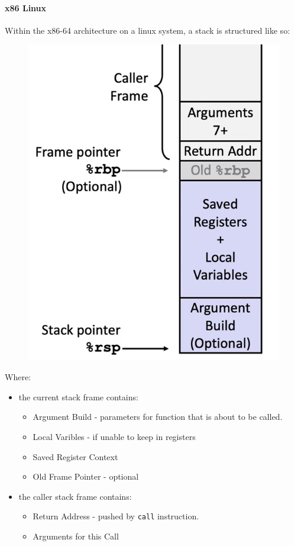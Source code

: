 \documentclass[12pt]{book}
\begin{document}
\paragraph{x86 Linux} 
Within the x86-64 architecture on a linux system, a stack is structured like so:
\begin{figure}[h]
        \centering
        \includegraphics[scale = 0.3]{./figures/x86stackframe}
\end{figure}

Where:
\begin{itemize}
        \item the current stack frame contains:
                \begin{itemize}
                        \item Argument Build - parameters for function that is about to be called.
                        \item Local Varibles - if unable to keep in registers
                        \item Saved Register Context
                        \item Old Frame Pointer - optional
                \end{itemize}
        \item the caller stack frame contains:
                \begin{itemize}
                        \item Return Address - pushed by \texttt{call} instruction.
                        \item Arguments for this Call
                \end{itemize}
\end{itemize}
\end{document}
